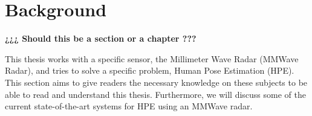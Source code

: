 \chapter{Background}
\label{chapter: background}


\textbf{¿¿¿ Should this be a section or a chapter ???}

This thesis works with a specific sensor, the Millimeter Wave Radar (MMWave Radar), and tries to solve a specific problem, Human Pose Estimation (HPE). 
This section aims to give readers the necessary knowledge on these subjects to be able to read and understand this thesis.
Furthermore, we will discuss some of the current state-of-the-art systems for HPE using an MMWave radar.